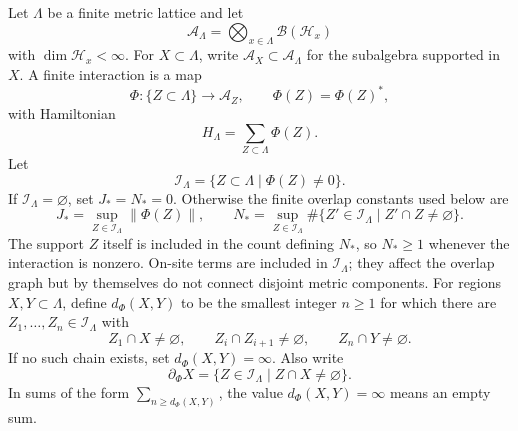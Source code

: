 Let \(\Lambda\) be a finite metric lattice and let
\[
  \mathcal A_\Lambda=\bigotimes_{x\in\Lambda}\mathcal B(\mathcal H_x)
\]
with \(\dim\mathcal H_x<\infty\).  For \(X\subset\Lambda\), write
\(\mathcal A_X\subset\mathcal A_\Lambda\) for the subalgebra supported in
\(X\).  A finite interaction is a map
\[
  \Phi:\{Z\subset\Lambda\}\longrightarrow \mathcal A_Z,
  \qquad
  \Phi(Z)=\Phi(Z)^*,
\]
with Hamiltonian
\[
  H_\Lambda=\sum_{Z\subset\Lambda}\Phi(Z).
\]
Let
\[
  \mathcal I_\Lambda=\{Z\subset\Lambda\mid \Phi(Z)\ne0\}.
\]
If \(\mathcal I_\Lambda=\varnothing\), set \(J_*=N_*=0\).  Otherwise the
finite overlap constants used below are
\[
  J_*=\sup_{Z\in\mathcal I_\Lambda}\|\Phi(Z)\|,
  \qquad
  N_*=\sup_{Z\in\mathcal I_\Lambda}
  \#\{Z'\in\mathcal I_\Lambda\mid Z'\cap Z\ne\varnothing\}.
\]
The support \(Z\) itself is included in the count defining \(N_*\), so
\(N_*\ge1\) whenever the interaction is nonzero.  On-site terms are included in
\(\mathcal I_\Lambda\); they affect the overlap graph but by themselves do not
connect disjoint metric components.
For regions \(X,Y\subset\Lambda\), define \(d_\Phi(X,Y)\) to be the smallest
integer \(n\ge1\) for which there are \(Z_1,\ldots,Z_n\in\mathcal I_\Lambda\)
with
\[
  Z_1\cap X\ne\varnothing,\qquad
  Z_i\cap Z_{i+1}\ne\varnothing,\qquad
  Z_n\cap Y\ne\varnothing .
\]
If no such chain exists, set \(d_\Phi(X,Y)=\infty\).  Also write
\[
  \partial_\Phi X=\{Z\in\mathcal I_\Lambda\mid Z\cap X\ne\varnothing\}.
\]
In sums of the form \(\sum_{n\ge d_\Phi(X,Y)}\), the value
\(d_\Phi(X,Y)=\infty\) means an empty sum.


